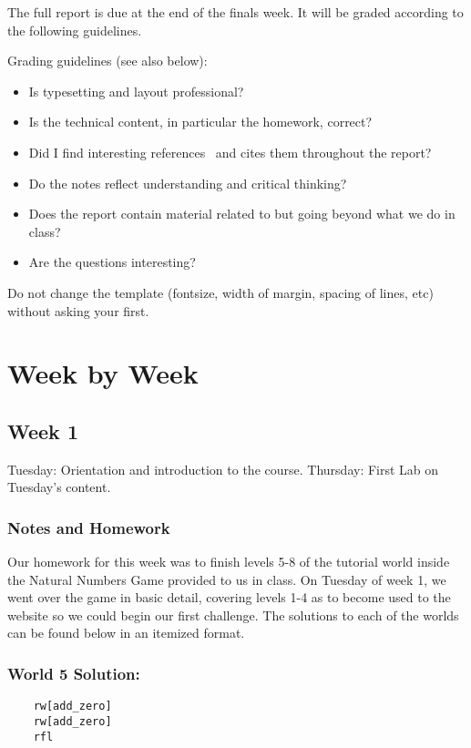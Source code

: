 \documentclass{article}
\theoremstyle{theorem}
\theoremstyle{definition}
\theoremstyle{remark}
\begin{document}
The full report is due at the end of the finals week. It will be graded according to the following guidelines.

Grading  guidelines (see also below):
\begin{itemize}
\item Is typesetting and layout professional? 
\item Is the technical content, in particular the homework, correct?
\item Did I find interesting references~\cite{bla} and cites them throughout the report?
\item Do the notes reflect understanding and critical thinking?
\item Does the report contain material related to but going beyond what we do in class?
\item Are the questions interesting?
\end{itemize}

Do not change the template (fontsize, width of margin, spacing of lines, etc) without asking your first.

\section{Week by Week}\label{homework}

\subsection{Week 1}
  Tuesday: Orientation and introduction to the course. 
  \newline Thursday: First Lab on Tuesday's content.

\subsubsection{Notes and Homework}
  Our homework for this week was to finish levels 5-8 of the tutorial world inside the Natural Numbers Game provided to us in class. On Tuesday of week 1, we went over the game in basic detail, covering levels 1-4 as to become used to the website so we could begin our first challenge. The solutions to each of the worlds can be found below in an itemized format.

\subsubsection*{World 5 Solution:}
  \begin{lstlisting}
    rw[add_zero]
    rw[add_zero]
    rfl
  \end{lstlisting}
\end{document}
